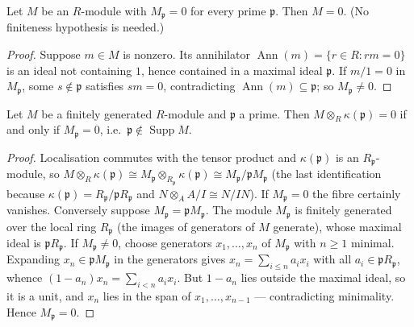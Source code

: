 \begin{lemma}
  \label{lem:zero_of_forall_localization_zero}
  \leanok
  Let \(M\) be an \(R\)-module with \(M_{\mathfrak p} = 0\) for every prime
  \(\mathfrak p\). Then \(M = 0\). (No finiteness hypothesis is needed.)
\end{lemma}
\begin{proof}
  \leanok
  Suppose \(m \in M\) is nonzero. Its annihilator
  \(\operatorname{Ann}(m) = \{r \in R : rm = 0\}\) is an ideal not containing \(1\),
  hence contained in a maximal ideal \(\mathfrak p\). If \(m/1 = 0\) in
  \(M_{\mathfrak p}\), some \(s \notin \mathfrak p\) satisfies \(sm = 0\),
  contradicting \(\operatorname{Ann}(m) \subseteq \mathfrak p\); so
  \(M_{\mathfrak p} \neq 0\).
\end{proof}

\begin{lemma}
  \label{lem:fibre_vanishing_iff_localization_zero}
  \leanok
  Let \(M\) be a finitely generated \(R\)-module and \(\mathfrak p\) a prime. Then
  \(M \otimes_R \kappa(\mathfrak p) = 0\) if and only if \(M_{\mathfrak p} = 0\), i.e.\
  \(\mathfrak p \notin \operatorname{Supp} M\).
\end{lemma}
\begin{proof}
  \leanok
  Localisation commutes with the tensor product and \(\kappa(\mathfrak p)\) is an
  \(R_{\mathfrak p}\)-module, so
  \(M \otimes_R \kappa(\mathfrak p) \cong M_{\mathfrak p} \otimes_{R_{\mathfrak p}}
  \kappa(\mathfrak p) \cong M_{\mathfrak p}/\mathfrak p M_{\mathfrak p}\)
  (the last identification because \(\kappa(\mathfrak p) =
  R_{\mathfrak p}/\mathfrak p R_{\mathfrak p}\) and \(N \otimes_A A/I \cong N/IN\)).
  If \(M_{\mathfrak p} = 0\) the fibre certainly vanishes. Conversely suppose
  \(M_{\mathfrak p} = \mathfrak p M_{\mathfrak p}\). The module \(M_{\mathfrak p}\) is
  finitely generated over the local ring \(R_{\mathfrak p}\) (the images of generators
  of \(M\) generate), whose maximal ideal is \(\mathfrak p R_{\mathfrak p}\). If
  \(M_{\mathfrak p} \neq 0\), choose generators \(x_1, \dots, x_n\) of
  \(M_{\mathfrak p}\) with \(n \geq 1\) minimal. Expanding
  \(x_n \in \mathfrak p M_{\mathfrak p}\) in the generators gives
  \(x_n = \sum_{i \leq n} a_i x_i\) with all
  \(a_i \in \mathfrak p R_{\mathfrak p}\), whence
  \((1 - a_n) x_n = \sum_{i < n} a_i x_i\). But \(1 - a_n\) lies outside the maximal
  ideal, so it is a unit, and \(x_n\) lies in the span of \(x_1, \dots, x_{n-1}\) ---
  contradicting minimality. Hence \(M_{\mathfrak p} = 0\).
\end{proof}

